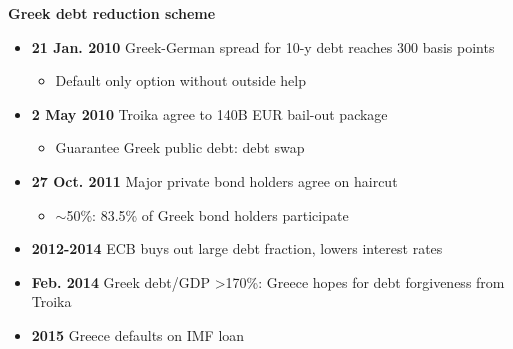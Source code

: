 \documentclass{beamer}
\begin{document}
\begin{frame}
  \textbf{Greek debt reduction scheme}
  \begin{itemize}
    \item \textbf{21 Jan. 2010} Greek-German spread for 10-y debt reaches 300 basis points
    \begin{itemize}
      \item Default only option without outside help
    \end{itemize}
    \item \textbf{2 May 2010} Troika agree to 140B EUR bail-out package
    \begin{itemize}
      \item Guarantee Greek public debt: debt swap
    \end{itemize}
    \item \textbf{27 Oct. 2011} Major private bond holders agree on haircut
    \begin{itemize}
      \item $\sim$50\%: 83.5\% of Greek bond holders participate
    \end{itemize}
    \item \textbf{2012-2014} ECB buys out large debt fraction, lowers interest rates
  	\item \textbf{Feb. 2014} Greek debt/GDP >170\%: Greece hopes for debt forgiveness from Troika
  	\item \textbf{2015} Greece defaults on IMF loan
  \end{itemize}
\end{frame}
\end{document}
